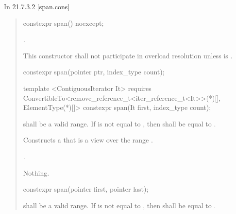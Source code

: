 \documentclass{wg21}
\begin{document}
In 21.7.3.2 [span.cons]

\begin{quote}

	
\begin{itemdecl}
	constexpr span() noexcept;
\end{itemdecl}
\begin{itemdescr}
	\pnum
	\ensures
	.
	
	\pnum
	\remarks
	This constructor shall not participate in overload resolution
	unless  is .
\end{itemdescr}
\begin{removedblock}
\begin{itemdecl}
constexpr span(pointer ptr, index_type count);
\end{itemdecl}
\end{removedblock}
\begin{addedblock}
\begin{itemdecl}
template <ContiguousIterator It>
requires ConvertibleTo<remove_reference_t<iter_reference_t<It>>(*)[], ElementType(*)[]>
constexpr span(It first, index_type count);
\end{itemdecl}
\end{addedblock}
\begin{itemdescr}
	\pnum
	\requires {} shall be a valid range.
	If  is not equal to ,
	then  shall be equal to .
	
	\pnum
	\effects
	Constructs a  that is a view over the range .
	
	\pnum
	\ensures
	.
	
	\pnum
	\throws
	Nothing.
\end{itemdescr}

	
\begin{removedblock}
\begin{itemdecl}
constexpr span(pointer first, pointer last);
\end{itemdecl}
\end{removedblock}
\begin{removedblock}

\begin{itemdescr}
	\pnum
	\requires
	 shall be a valid range.
	If  is not equal to ,
	then  shall be equal to .
	

\end{itemdescr}
\end{removedblock}
\end{quote}
\end{document}
